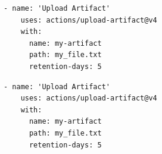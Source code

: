 \begin{minipage}[t]{0.48\linewidth}
\begin{lstlisting}[basicstyle=\ttfamily\scriptsize,caption={ID 82: documentation reference.},label={lst:original82}]
  - name: 'Upload Artifact'
    uses: actions/upload-artifact@v4
    with:
      name: my-artifact
      path: my_file.txt
      retention-days: 5
\end{lstlisting}
\end{minipage}\hfill\begin{minipage}[t]{0.48\linewidth}
\begin{lstlisting}[basicstyle=\ttfamily\scriptsize,caption={ID 82: cached Gemma3 reference.},label={lst:cached82}]
- name: 'Upload Artifact'
    uses: actions/upload-artifact@v4
    with:
      name: my-artifact
      path: my_file.txt
      retention-days: 5
\end{lstlisting}
\end{minipage}
